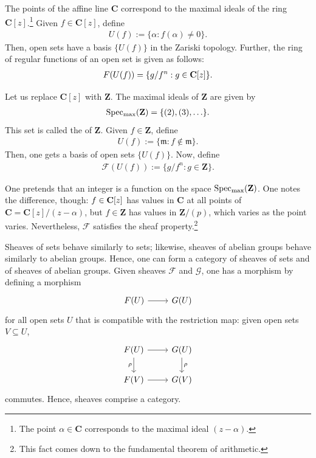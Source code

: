 \documentclass [11 pt, oneside] {article}
\begin{document}
\begin{example}[ ]\label{}\text{}
The points of the affine line $\mathbf{C}$ correspond to the maximal ideals of the ring $\mathbf{C}[z]$.\footnote{The point $\alpha\in \mathbf{C}$ corresponds to the maximal ideal $(z-\alpha)$.} Given $f\in \mathbf{C}[z]$, define
\begin{align*}
	U(f) := \{\alpha : f(\alpha)\ne 0\}.
\end{align*}
Then, open sets have a basis $\{U(f)\}$ in the Zariski topology. Further, the ring of regular functions of an open set is given as follows: 
\begin{align*}
	\relax{F}(U(f)) = \{g/f^n: g\in \mathbf C[z]\}.
\end{align*}

Let us replace $\mathbf{C}[z]$ with $\mathbf{Z}$. The maximal ideals of $\mathbf{Z}$ are given by
\begin{align*}
	\operatorname{Spec\textsubscript{max}}(\mathbf{Z}) = \{(2),  (3),\hdots\}.
\end{align*}
This set is called the  of $\mathbf{Z}$. Given $f\in \mathbf{Z}$, define 
\begin{align*}
	U(f) := \{\mathfrak{m}: f\notin  \mathfrak{m}\}.
\end{align*}
Then, one gets a basis of open sets $\{U(f)\}$. Now, define
\begin{align*}
	\mathscr{F}(U(f)) := \{ g/f^n : g\in \mathbf{Z}\}.
\end{align*}

One pretends that an integer is a function on the space $\operatorname{Spec\textsubscript{max}}(\mathbf{Z})$. One notes the difference, though: $f\in \mathbf C[z]$ has values in $\mathbf{C}$ at all points of $\mathbf{C} = \mathbf{C}[z]/(z-\alpha)$, but $f\in \mathbf{Z}$ has values in $\mathbf{Z}/(p)$, which varies as the point varies. Nevertheless, $\mathscr{F}$ satisfies the sheaf property.\footnote{This fact comes down to the fundamental theorem of arithmetic.}
\end{example}

Sheaves of sets behave similarly to sets; likewise, sheaves of abelian groups behave similarly to abelian groups. Hence, one can form a category of sheaves of sets and of sheaves of abelian groups. Given sheaves $\mathscr{F}$ and $\mathscr{G}$, one has a morphism by defining a morphism 
\[
\begin{tikzcd}
\mathscr{F}(U) \ar[r]& \mathscr{G}(U)
\end{tikzcd}
\]
for all open sets $U$ that is compatible with the restriction map: given open sets $V\subseteq U$,
\[
\begin{tikzcd}
	\mathscr{F}(U)\ar[d,"\rho", swap] \ar[r]&  \mathscr{G}(U)  \ar[d,"\rho"] \\
	\mathscr{F}(V) \ar[r]&  \mathscr{G}(V)
\end{tikzcd}
\]
commutes. Hence, sheaves comprise a category.
\end{document}
